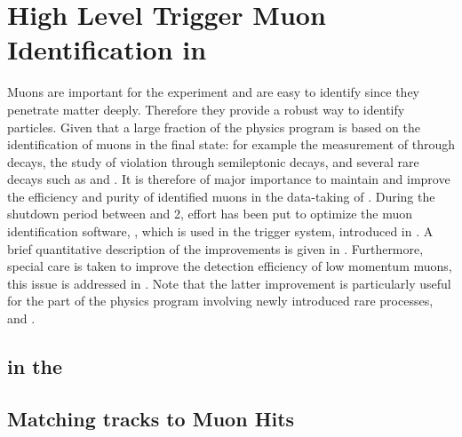 \chapter{High Level Trigger Muon Identification in \runtwo}
\label{Muon_id_hlt}

Muons are important for the \lhcb experiment and are easy to identify since they penetrate matter deeply.
Therefore they provide a robust way to identify \jpsi particles. Given that a large fraction of the \lhcb physics
program is based on the identification of muons in the final state: for example the measurement of \phis through
\BsJpsiPhi decays, the study of \CP violation through semileptonic decays, and several rare decays such as
\BdKstmumu and \Bsmm. It is therefore of major importance to maintain and improve the efficiency and purity of identified muons in
the \runtwo data-taking of \lhcb. During the shutdown period between \runone and 2, effort has been put to
optimize the muon identification software, \muonID, which is used in the \lhcb trigger system, introduced in .
A brief quantitative description of the \muonID improvements is given in .
Furthermore, special care is taken to improve the detection efficiency of low momentum muons, this issue is
addressed in . Note that the latter improvement is particularly useful for the part
of the \lhcb physics program involving newly introduced rare processes, \eg \Sigmapmumu \cite{LHCB-CONF-2016-013-001} and \Ksmumu \cite{LHCb-CONF-2016-012}.

\section{\hltone \muonID in the \lhc \runtwo}
\label{muid_hlt1}


\section{Matching \velo tracks to Muon Hits}
\label{mvm_algorrithm}

